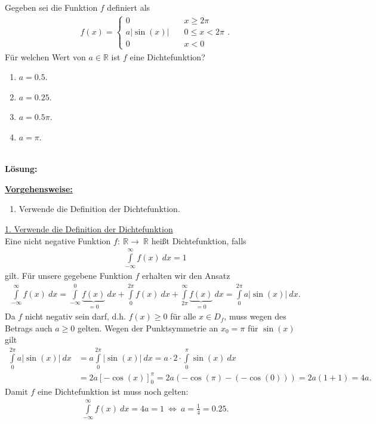 \subsection*{}
Gegeben sei die Funktion $f $ definiert als 
\begin{align*}
	f(x)
	=
	\begin{cases}
		0 \quad & x \geq 2 \pi\\
		a | \sin(x)  | \quad &0 \leq x < 2 \pi\\
		0 \quad &x<0
	\end{cases}.
\end{align*}
Für welchen Wert von $a \in \mathbb{R}$ ist $f$ eine Dichtefunktion?
\renewcommand{\labelenumi}{(\alph{enumi})}
\begin{enumerate}
	\item 
	$a = 0.5$.
	\item
	$a =0.25$.
	\item
	$a = 0.5 \pi $.
	\item
	$a = \pi$.
\end{enumerate}
\ \\
\textbf{Lösung:}
\begin{mdframed}
\underline{\textbf{Vorgehensweise:}}
\renewcommand{\labelenumi}{\theenumi.}
\begin{enumerate}
\item Verwende die Definition der Dichtefunktion.
\end{enumerate}
\end{mdframed}

\underline{1. Verwende die Definition der Dichtefunktion}\\
Eine nicht negative Funktion $f : \ \mathbb{R} \to \ \mathbb{R}$ heißt Dichtefunktion, falls
\begin{align*}
	\int \limits_{- \infty}^\infty f(x) \ dx = 1
\end{align*}
gilt. Für unsere gegebene Funktion $f$ erhalten wir den Ansatz 
\begin{align*}
	\int \limits_{- \infty}^\infty f(x) \ dx
	=
	\int \limits_{- \infty}^{0} \underbrace{f(x)}_{= 0} \ dx
	+
	\int \limits_{0}^{2 \pi} f(x) \ dx
	+
	\int \limits_{2 \pi}^\infty \underbrace{f(x)}_{= 0} \ dx
	=
	\int \limits_{0}^{2 \pi} a | \sin(x) | \ dx.
\end{align*}
Da $f$ nicht negativ sein darf, d.h. $f(x) \geq 0$ für alle $x \in D_f$, muss wegen des Betrags auch $a \geq 0 $ gelten.
Wegen der Punktsymmetrie an $x_0  = \pi$ für $\sin(x)$ gilt
\begin{align*}
	\int \limits_{0}^{2 \pi} a | \sin(x) | \ dx
	&=
	a \int \limits_{0}^{2 \pi}  | \sin(x) | \ dx
	=
	a \cdot 2 \cdot  \int \limits_{0}^\pi \sin(x) \ dx\\
	&=
	2a \left[- \cos (x)\right]_{0}^\pi
	= 
	2a ( -\cos(\pi) - (- \cos(0)) )
	=
	2a ( 1 + 1 ) = 4a. 
\end{align*} 
Damit $f$ eine Dichtefunktion ist muss noch gelten: 
\begin{align*}
	\int \limits_{- \infty}^\infty f(x) \ dx  = 4a = 1  
	\ \Leftrightarrow \
	a = \frac{1}{4} = 0.25.
\end{align*}

